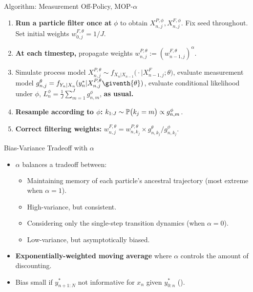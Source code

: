 \documentclass{beamer}
\begin{document}
\begin{frame}{Algorithm: Measurement Off-Policy, MOP-$\alpha$}
    \begin{enumerate}
        \item \textbf{Run a particle filter once at} $\phi$ to obtain $X_{n,j}^{P,\phi}, X_{n,j}^{F,\phi}$. Fix seed throughout. Set initial weights $w_{0,j}^{F,\theta} = 1/J$.
        \item \pause \textbf{At each timestep,} propagate weights $w_{n,j}^{P,\theta} := (w_{n-1,j}^{F,\theta})^\alpha$. 
        \item \pause Simulate process model ${X}_{n,j}^{P,\theta}\sim {f}_{{X}_{n}|{X}_{n-1}}\big(\cdot|{X}_{n-1,j}^{F};{\theta}\big)$, evaluate measurement model $g^{\theta}_{n,j}={f}_{{Y}_{n}|{X}_{n}}(y_{n}^{*}|{X}_{n,j}^{P,\theta}\giventh{\theta})$, evaluate conditional likelihood under $\phi$, $L_n^{\phi} = \frac{1}{J}\sum_{m=1}^{J}g^{\phi}_{n,m}$, \textbf{as usual.}
        \item \pause \textbf{Resample according to $\phi$:} $k_{1:J} \sim \mathbb{P}\big(k_{j}=m\big) \propto g^{\phi}_{n,m}$.
        \item \pause \textbf{Correct filtering weights:} $\displaystyle w^{F,\theta}_{n,j}= w^{P,\theta}_{n,k_j} \times  g^{\theta}_{n,k_j}/ g^{\phi}_{n,k_j}$. 
    \end{enumerate}
    \pause 
\end{frame}


\begin{frame}{Bias-Variance Tradeoff with $\alpha$}
\begin{itemize}
    \item $\alpha$ balances a tradeoff between:
    \begin{itemize}
        \item \pause Maintaining memory of each particle's ancestral trajectory (most extreme when $\alpha=1$).
        \item \pause High-variance, but consistent.
        \item \pause Considering only the single-step transition dynamics (when $\alpha=0$).
        \item \pause Low-variance, but asymptotically biased.
    \end{itemize}
    \item \pause\textbf{Exponentially-weighted moving average} where $\alpha$ controls the amount of discounting.
    \item \pause Bias small if $y_{n+1:N}^*$ not informative for $x_n$ given $y_{0:n}^*$ (\cite{corenflos21}).
\end{itemize}
    
\end{frame}
\end{document}
